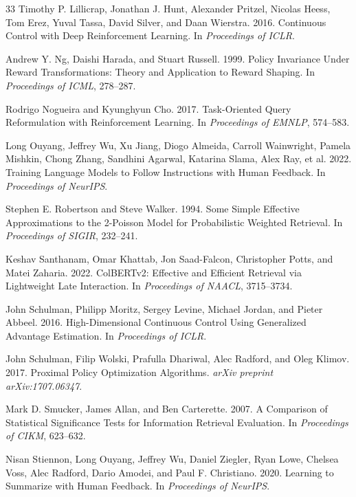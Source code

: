 \documentclass[sigconf]{acmart}
\begin{document}
\begin{thebibliography}{33}
Timothy P. Lillicrap, Jonathan J. Hunt, Alexander Pritzel, Nicolas Heess, Tom Erez, Yuval Tassa, David Silver, and Daan Wierstra. 2016. Continuous Control with Deep Reinforcement Learning. In \textit{Proceedings of ICLR}.

Andrew Y. Ng, Daishi Harada, and Stuart Russell. 1999. Policy Invariance Under Reward Transformations: Theory and Application to Reward Shaping. In \textit{Proceedings of ICML}, 278--287.

Rodrigo Nogueira and Kyunghyun Cho. 2017. Task-Oriented Query Reformulation with Reinforcement Learning. In \textit{Proceedings of EMNLP}, 574--583.

Long Ouyang, Jeffrey Wu, Xu Jiang, Diogo Almeida, Carroll Wainwright, Pamela Mishkin, Chong Zhang, Sandhini Agarwal, Katarina Slama, Alex Ray, et al. 2022. Training Language Models to Follow Instructions with Human Feedback. In \textit{Proceedings of NeurIPS}.

Stephen E. Robertson and Steve Walker. 1994. Some Simple Effective Approximations to the 2-Poisson Model for Probabilistic Weighted Retrieval. In \textit{Proceedings of SIGIR}, 232--241.

Keshav Santhanam, Omar Khattab, Jon Saad-Falcon, Christopher Potts, and Matei Zaharia. 2022. ColBERTv2: Effective and Efficient Retrieval via Lightweight Late Interaction. In \textit{Proceedings of NAACL}, 3715--3734.

John Schulman, Philipp Moritz, Sergey Levine, Michael Jordan, and Pieter Abbeel. 2016. High-Dimensional Continuous Control Using Generalized Advantage Estimation. In \textit{Proceedings of ICLR}.

John Schulman, Filip Wolski, Prafulla Dhariwal, Alec Radford, and Oleg Klimov. 2017. Proximal Policy Optimization Algorithms. \textit{arXiv preprint arXiv:1707.06347}.

Mark D. Smucker, James Allan, and Ben Carterette. 2007. A Comparison of Statistical Significance Tests for Information Retrieval Evaluation. In \textit{Proceedings of CIKM}, 623--632.

Nisan Stiennon, Long Ouyang, Jeffrey Wu, Daniel Ziegler, Ryan Lowe, Chelsea Voss, Alec Radford, Dario Amodei, and Paul F. Christiano. 2020. Learning to Summarize with Human Feedback. In \textit{Proceedings of NeurIPS}.


\end{thebibliography}
\end{document}
